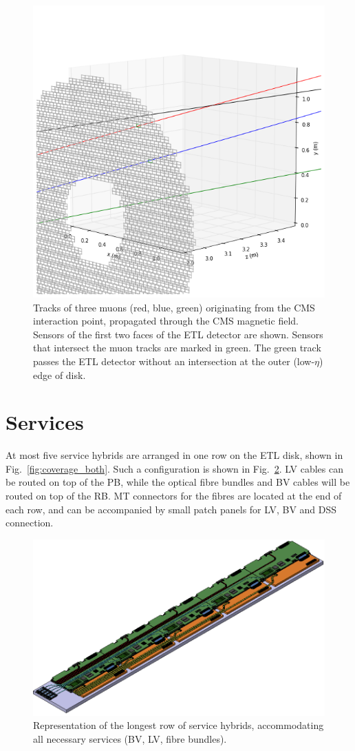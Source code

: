 \documentclass[11pt]{article}
\begin{document}
\begin{figure}[!ht]
\centering
\includegraphics[width=0.70 \textwidth]{figures/intersect_3D.png}
\caption{
Tracks of three muons (red, blue, green) originating from the CMS interaction point, propagated through the CMS magnetic field.
Sensors of the first two faces of the ETL detector are shown.
Sensors that intersect the muon tracks are marked in green.
The green track passes the ETL detector without an intersection at the outer (low-$\eta$) edge of disk.
}
\label{fig:intersect}
\end{figure}

\section{Services}

At most five service hybrids are arranged in one row on the ETL disk, shown in Fig.~\ref{fig:coverage_both}.
Such a configuration is shown in Fig.~\ref{fig:services}.
LV cables can be routed on top of the PB, while the optical fibre bundles and BV cables will be routed on top of the RB.
MT connectors for the fibres are located at the end of each row, and can be accompanied by small patch panels for LV, BV and DSS connection.

\begin{figure}[!ht]
\centering
\includegraphics[width=0.90 \textwidth]{figures/services.png}
\caption{
Representation of the longest row of service hybrids, accommodating all necessary services (BV, LV, fibre bundles).
}
\label{fig:services}
\end{figure}
\end{document}
